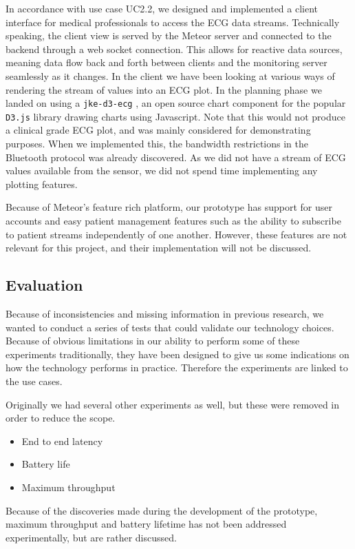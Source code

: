 In accordance with use case \textsc{UC2.2}, we designed and implemented a client interface for medical professionals to access the ECG data streams. Technically speaking, the client view is served by the Meteor server and connected to the backend through a web socket connection. This allows for reactive data sources, meaning data flow back and forth between clients and the monitoring server seamlessly as it changes. In the client we have been looking at various ways of rendering the stream of values into an ECG plot. In the planning phase we landed on using a \texttt{jke-d3-ecg} \cite{jke_d3}, an open source chart component for the popular \texttt{D3.js} library drawing charts using Javascript. Note that this would not produce a clinical grade ECG plot, and was mainly considered for demonstrating purposes. When we implemented this, the bandwidth restrictions in the Bluetooth protocol was already discovered. As we did not have a stream of ECG values available from the sensor, we did not spend time implementing any plotting features. 

Because of Meteor's feature rich platform, our prototype has support for user accounts and easy patient management features such as the ability to subscribe to patient streams independently of one another. However, these features are not relevant for this project, and their implementation will not be discussed.


\subsection{Evaluation} %
\label{sub:evaluation}

Because of inconsistencies and missing information in previous research, we wanted to conduct a series of tests that could validate our technology choices. Because of obvious limitations in our ability to perform some of these experiments traditionally, they have been designed to give us some indications on how the technology performs in practice. Therefore the experiments are linked to the use cases. 

Originally we had several other experiments as well, but these were removed in order to reduce the scope. 

\begin{itemize}
	\item End to end latency
	\item Battery life
	\item Maximum throughput
\end{itemize}
\noindent
Because of the discoveries made during the development of the prototype, maximum throughput and battery lifetime has not been addressed experimentally, but are rather discussed.

